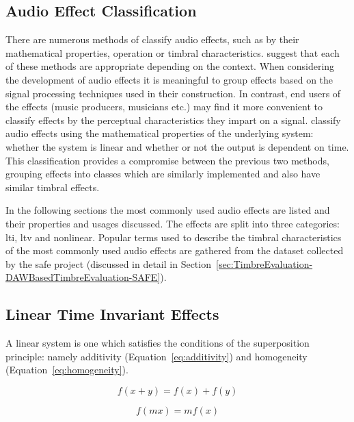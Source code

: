 	\subsection{Audio Effect Classification}
	\label{sec:Timbre-AudioProcessing-Classification}
		There are numerous methods of classify audio effects, such as by their mathematical properties, operation
		or timbral characteristics. \citet{verfaille2006an} suggest that each of these methods are appropriate
		depending on the context. When considering the development of audio effects it is meaningful to group
		effects based on the signal processing techniques used in their construction. In contrast, end users of the
		effects (music producers, musicians etc.) may find it more convenient to classify effects by the perceptual
		characteristics they impart on a signal. \citet{eichas2015feature} classify audio effects using the
		mathematical properties of the underlying system: whether the system is linear and whether or not the
		output is dependent on time. This classification provides a compromise between the previous two methods,
		grouping effects into classes which are similarly implemented and also have similar timbral effects.
		
		In the following sections the most commonly used audio effects are listed and their properties and usages
		discussed. The effects are split into three categories: \acrfull{lti}, \acrfull{ltv} and nonlinear. Popular
		terms used to describe the timbral characteristics of the most commonly used audio effects are gathered
		from the dataset collected by the \acrshort{safe} project (discussed in detail in
		Section~\ref{sec:TimbreEvaluation-DAWBasedTimbreEvaluation-SAFE}).

	\subsection{Linear Time Invariant Effects}
	\label{sec:Timbre-AudioProcessing-LTI}
		A linear system is one which satisfies the conditions of the superposition principle: namely additivity
		(Equation~\ref{eq:additivity}) and homogeneity (Equation~\ref{eq:homogeneity}).

		\begin{equation} f(x + y) = f(x) + f(y) \label{eq:additivity} \end{equation}

		\begin{equation} f(mx) = mf(x) \label{eq:homogeneity} \end{equation}


